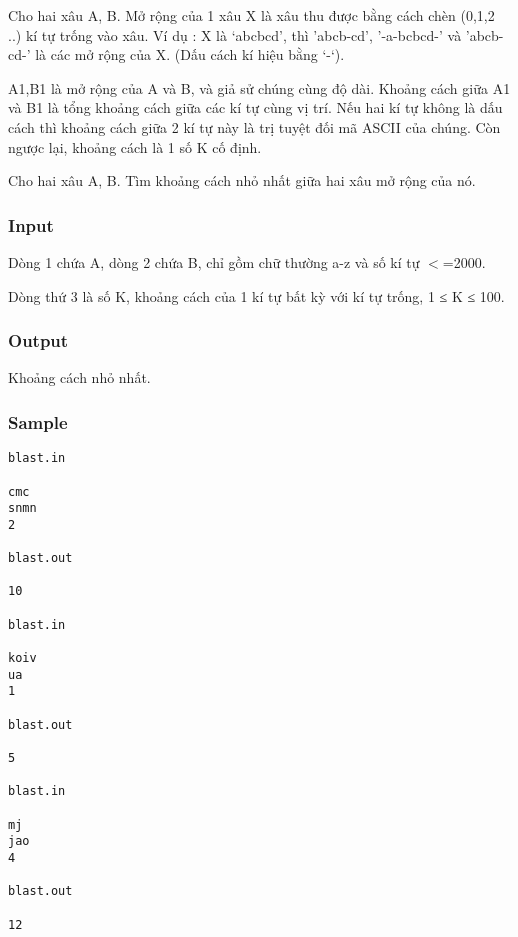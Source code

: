 



   Cho hai xâu A, B.  Mở rộng của 1 xâu X là xâu thu được bằng cách chèn (0,1,2 ..) kí tự trống vào xâu.  Ví dụ :  X là ‘abcbcd’, thì 'abcb-cd', '-a-bcbcd-'  và 'abcb-cd-'  là các mở rộng của X. (Dấu cách kí hiệu bằng ‘-‘).  

   A1,B1 là mở rộng của A và B, và giả sử chúng cùng độ dài. Khoảng cách giữa  A1 và B1 là tổng khoảng cách giữa các kí tự cùng vị trí. Nếu hai kí tự  không là dấu cách thì khoảng cách giữa 2 kí tự này là trị tuyệt đối mã  ASCII của chúng. Còn ngược lại, khoảng cách là 1 số K cố định.  

   Cho hai xâu A, B. Tìm khoảng cách nhỏ nhất giữa hai xâu mở rộng của nó.  

\subsubsection{   Input  }

   Dòng 1 chứa A, dòng 2 chứa B, chỉ gồm chữ thường a-z và số kí tự $<$=2000.  

   Dòng thứ 3 là số K, khoảng cách của 1 kí tự bất kỳ với kí tự trống, 1 ≤ K ≤ 100.  

\subsubsection{   Output  }

   Khoảng cách nhỏ nhất.  

\subsubsection{   Sample  }


\begin{verbatim}
blast.in 
 
cmc 
snmn 
2 
 
blast.out 
 
10 

blast.in 
 
koiv 
ua 
1 
 
blast.out 
 
5

blast.in 
 
mj 
jao 
4 
 
blast.out 
 
12 

\end{verbatim}

